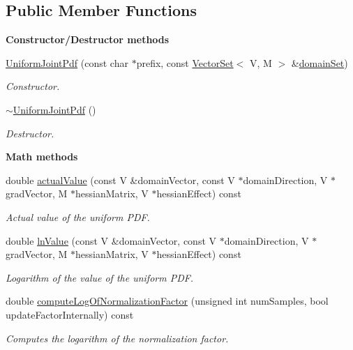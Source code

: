 \subsection*{Public Member Functions}
\begin{Indent}{\bf Constructor/\-Destructor methods}\par
\begin{DoxyCompactItemize}
\item 
\hyperlink{class_q_u_e_s_o_1_1_uniform_joint_pdf_a2322d8b9485f1d5fad00083fa5ef46a2}{Uniform\-Joint\-Pdf} (const char $\ast$prefix, const \hyperlink{class_q_u_e_s_o_1_1_vector_set}{Vector\-Set}$<$ V, M $>$ \&\hyperlink{class_q_u_e_s_o_1_1_base_scalar_function_ad0937628825249dd36ded3ce0c7959ac}{domain\-Set})
\begin{DoxyCompactList}\small\item\em Constructor. \end{DoxyCompactList}\item 
\hyperlink{class_q_u_e_s_o_1_1_uniform_joint_pdf_a8061747b487d8686414b614e7bdc0369}{$\sim$\-Uniform\-Joint\-Pdf} ()
\begin{DoxyCompactList}\small\item\em Destructor. \end{DoxyCompactList}\end{DoxyCompactItemize}
\end{Indent}
\begin{Indent}{\bf Math methods}\par
\begin{DoxyCompactItemize}
\item 
double \hyperlink{class_q_u_e_s_o_1_1_uniform_joint_pdf_a358ffa410284ed3e40435439c1c8bbc3}{actual\-Value} (const V \&domain\-Vector, const V $\ast$domain\-Direction, V $\ast$grad\-Vector, M $\ast$hessian\-Matrix, V $\ast$hessian\-Effect) const 
\begin{DoxyCompactList}\small\item\em Actual value of the uniform P\-D\-F. \end{DoxyCompactList}\item 
double \hyperlink{class_q_u_e_s_o_1_1_uniform_joint_pdf_a80858abd7ca07ed42b9e9f0e4c92b3d2}{ln\-Value} (const V \&domain\-Vector, const V $\ast$domain\-Direction, V $\ast$grad\-Vector, M $\ast$hessian\-Matrix, V $\ast$hessian\-Effect) const 
\begin{DoxyCompactList}\small\item\em Logarithm of the value of the uniform P\-D\-F. \end{DoxyCompactList}\item 
double \hyperlink{class_q_u_e_s_o_1_1_uniform_joint_pdf_a7104edeec3bc1a45f4c8a805cdfde170}{compute\-Log\-Of\-Normalization\-Factor} (unsigned int num\-Samples, bool update\-Factor\-Internally) const 
\begin{DoxyCompactList}\small\item\em Computes the logarithm of the normalization factor. \end{DoxyCompactList}\end{DoxyCompactItemize}
\end{Indent}
